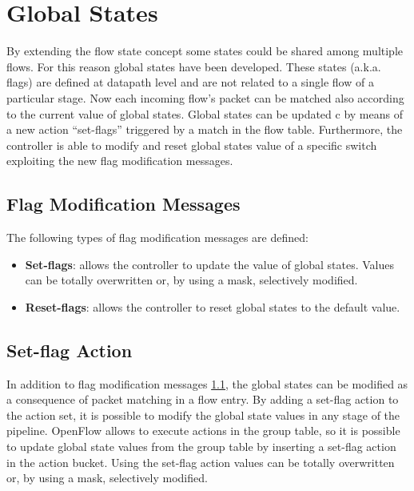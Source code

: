 
\chapter{Global States}
\label{chap:global_states}
By extending the flow state concept some states could be shared among multiple flows. For this reason global states have been developed. These states (a.k.a. flags) are defined at datapath level and are not related to a single flow of a particular stage. Now each incoming flow’s packet can be matched also according to the current value of global states. Global states can be updated c by means of a new action ``set-flags'' triggered by a match in the flow table. Furthermore, the controller is able to modify and reset global states value of a specific switch exploiting the new flag modification messages.


\section{Flag Modification Messages}
\label{sec:flag_mod_msg}

The following types of flag modification messages are defined:

\begin{itemize}
	\item \textbf{Set-flags}: allows the controller to update the value of global states. Values can be totally overwritten or, by using a mask, selectively modified.
	\item \textbf{Reset-flags}: allows the controller to reset global states to the default value.
\end{itemize}

\section{Set-flag Action}
\label{sec:act_set_flag}

In addition to flag modification messages \ref{sec:flag_mod_msg}, the global states can be modified as a consequence of packet matching in a flow entry. By adding a set-flag action to the action set, it is possible to modify the global state values in any stage of the pipeline. OpenFlow allows to execute actions in the group table, so it is possible to update global state values from the group table by inserting a set-flag action in the action bucket. Using the set-flag action values can be totally overwritten or, by using a mask, selectively modified.